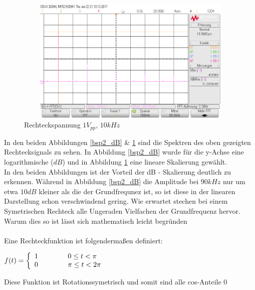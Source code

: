 \begin{figure}[H]
 \begin{center}
  \includegraphics[height=6cm,width=12cm]{OsziBilder/bsp2_Hanning_RMS_Cursor.png}
 \end{center}
 \caption{Rechteckspannung $1V_{pp}$, $10kHz$}\label{bsp2_rms}
\end{figure}
\noindent
In den beiden Abbildungen \ref{bsp2_dB} \& \ref{bsp2_rms} sind die Spektren des oben gezeigten Rechtecksignals zu sehen. In Abbildung \ref{bsp2_dB} wurde f\"ur die y-Achse eine logarithmische ($dB$) und in Abbildung \ref{bsp2_rms} eine lineare Skalierung gewählt. \\
In den beiden Abbildungen ist der Vorteil der dB - Skalierung deutlich zu erkennen. W\"ahrend in Abbildung \ref{bsp2_dB} die Amplitude bei $90kHz$ nur um etwa $10dB$ kleiner als die der Grundfrequnez ist, so ist diese in der linearen Darstellung schon verschwindend gering. \newpage \noindent
Wie erwartet stechen bei einem Symetrischen Rechteck alle Ungeraden Vielfachen der Grundfrequenz hervor. Warum dies so ist l\"asst sich mathematisch leicht begr\"unden \\ \\
Eine Rechteckfunktion ist folgenderma\ss{}en definiert:
\begin{center}
    $f(t) = \left\{\begin{array}{ll}
            1        \hspace{1.5cm} 0\leq t < \pi\\
            0        \hspace{1.5cm} \pi \leq t < 2\pi
            \end{array}\right.$
\end{center}
\noindent
Diese Funktion ist Rotationssymetrisch und somit sind alle cos-Anteile 0
